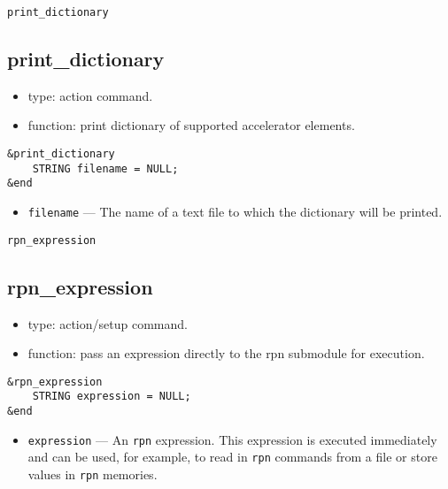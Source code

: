 \documentclass[11pt]{article}
\begin{document}
\begin{latexonly}
\newpage
\begin{center}{\Large\verb|print_dictionary|}\end{center}
\end{latexonly}
\subsection{print\_dictionary}

\begin{itemize}
\item type: action command.
\item function: print dictionary of supported accelerator elements.
\end{itemize}

\begin{verbatim}
&print_dictionary
    STRING filename = NULL;
&end
\end{verbatim}

\begin{itemize}
\item \verb|filename| --- The name of a text file to which the dictionary will be printed.
\end{itemize}

\begin{latexonly}
\newpage
\begin{center}{\Large\verb|rpn_expression|}\end{center}
\end{latexonly}
\subsection{rpn\_expression}

\begin{itemize}
\item type: action/setup command.
\item function: pass an expression directly to the rpn submodule for execution.
\end{itemize}

\begin{verbatim}
&rpn_expression
    STRING expression = NULL;
&end
\end{verbatim}

\begin{itemize}
\item \verb|expression| --- An {\tt rpn} expression.  This expression is executed immediately and can be
used, for example, to read in {\tt rpn} commands from a file or store values in {\tt rpn} memories.
\end{itemize}
\end{document}
